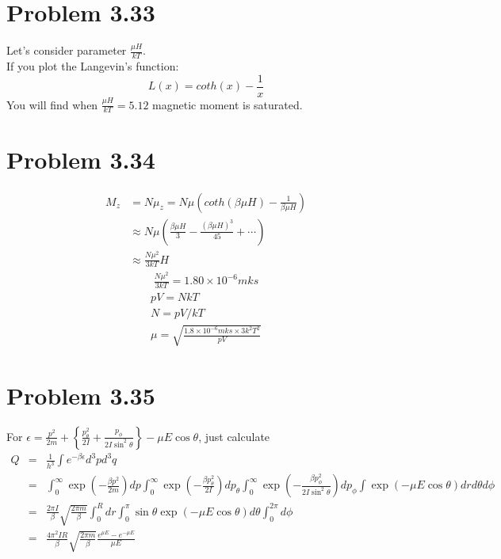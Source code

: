 \documentclass{article}
\begin{document}
\section*{Problem 3.33} %
\label{sec:problem_3_33}
	Let's consider parameter $\frac{\mu H}{kT}$.\\
	If you plot the Langevin's function:
	$$L(x)=coth(x)-\frac{1}{x}$$
	You will find when $\frac{\mu H}{kT}=5.12$ magnetic moment is saturated.\\

\section*{Problem 3.34}
	\begin{align}
		M_z&=N\mu_z=N\mu(coth(\beta \mu H)-\frac{1}{\beta \mu H})\\
		&\approx N\mu (\frac{\beta \mu H}{3}-\frac{(\beta \mu H)^3}{45}+\cdots)\\
		&\approx \frac{N\mu^2}{3kT}H
	\end{align}
	\begin{align}
		\frac{N\mu^2}{3kT}=1.80\times10^{-6} mks
	\end{align}
	\begin{align}
		pV=NkT\\
		N=pV/kT\\
		\mu=\sqrt{\frac{1.8\times10^{-6}mks \times3k^2T^2}{pV}}
	\end{align}

\section*{Problem 3.35} %
\label{sec:problem_3_35}
	For $ \epsilon=\frac{p^2}{2m}+\left\{ \frac{p_{\theta}^2}{2I}+\frac{p_{\phi}}{2I\sin^2 \theta} \right\} - \mu E \cos \theta $, just calculate
	\begin{eqnarray*}
		Q &=&  \frac{1}{h^3} \int e^{-\beta \epsilon} d^3pd^3q\\
		&=&\int^{\infty}_0 \exp\left(- \frac{\beta p^2}{2m} \right)dp\int^{\infty}_0 \exp\left(- \frac{\beta p_{\theta}^2}{2I} \right)dp_{\theta}\int^{\infty}_0 \exp\left(- \frac{\beta p_{\phi}^2}{2I\sin^2 \theta} \right)dp_{\phi}\int\exp(- \mu E \cos \theta) drd \theta d \phi\\
		&=&\frac{2 \pi I}{\beta} \sqrt{ \frac{2 \pi m}{\beta} } \int^R_0 dr \int^{\pi}_0 \sin \theta \exp(-\mu E \cos\theta)d \theta \int^{2 \pi}_0 d \phi\\
		&=&\frac{4 \pi^2 IR}{\beta} \sqrt{ \frac{2 \pi m}{\beta} }\frac{e^{\mu E}-e^{-\mu E}}{\mu E}
	\end{eqnarray*}
\end{document}
